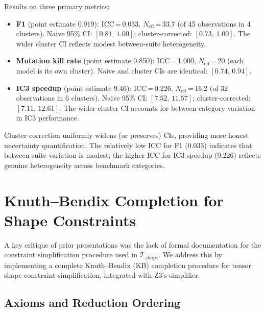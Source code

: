 \documentclass[11pt]{article}
\begin{document}
Results on three primary metrics:
\begin{itemize}[leftmargin=2em,nosep]
  \item \textbf{F1} (point estimate 0.919):
    ICC\,=\,0.033, $N_{\text{eff}}$\,=\,33.7 (of 45 observations
    in 4 clusters).
    Naive 95\% CI: $[0.81,\, 1.00]$;
    cluster-corrected: $[0.73,\, 1.00]$.
    The wider cluster CI reflects modest between-suite heterogeneity.
  \item \textbf{Mutation kill rate} (point estimate 0.850):
    ICC\,=\,1.000, $N_{\text{eff}}$\,=\,20 (each model is its own
    cluster).  Naive and cluster CIs are identical: $[0.74,\, 0.94]$.
  \item \textbf{IC3 speedup} (point estimate 9.46):
    ICC\,=\,0.226, $N_{\text{eff}}$\,=\,16.2 (of 32 observations
    in 6 clusters).
    Naive 95\% CI: $[7.52,\, 11.57]$;
    cluster-corrected: $[7.11,\, 12.61]$.
    The wider cluster CI accounts for between-category variation
    in IC3 performance.
\end{itemize}
Cluster correction uniformly widens (or preserves) CIs, providing
more honest uncertainty quantification.  The relatively low ICC
for F1 (0.033) indicates that between-suite variation is modest;
the higher ICC for IC3 speedup (0.226) reflects genuine
heterogeneity across benchmark categories.


\section{Knuth--Bendix Completion for Shape Constraints}\label{app:knuth-bendix}

A key critique of prior presentations was the lack of formal
documentation for the constraint simplification procedure used
in $\mathcal{T}_{\mathit{shape}}$.  We address this by implementing
a complete Knuth--Bendix (KB) completion procedure for tensor shape
constraint simplification, integrated with Z3's simplifier.

\subsection{Axioms and Reduction Ordering}
\end{document}
